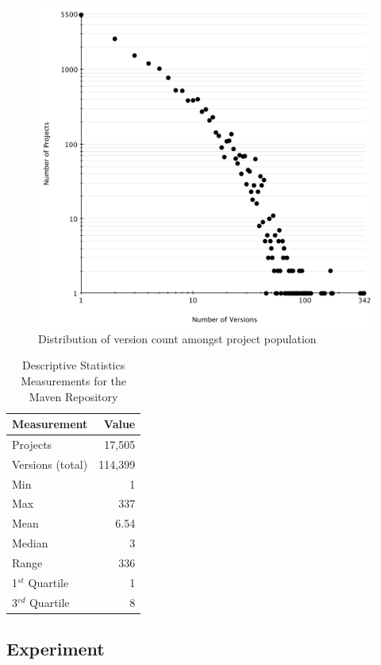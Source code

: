 \documentclass[conference]{IEEEtran}
\begin{document}
\begin{figure}
	\centering
	\includegraphics[scale=0.6]{version_count.pdf}
	\caption{Distribution of version count amongst project population}
	\label{fig:version-count}
\end{figure}

\begin{table}
\centering
\caption{Descriptive Statistics Measurements for the Maven Repository}
\label{tbl:repository}
\begin{tabular}{l r}
\hline
Measurement & Value\\
 \hline
Projects & 17,505\\
Versions (total) & 114,399\\
Min & 1\\
Max & 337\\
Mean & 6.54\\
Median & 3\\
Range & 336\\
1$^{st}$ Quartile & 1\\
3$^{rd}$ Quartile & 8\\
\hline
\end{tabular}
\end{table}

\subsection{Experiment}
\label{sec:exp}
\end{document}
